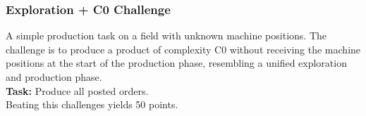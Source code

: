 \documentclass[12pt,twoside]{article}
\newcommand{\reftab}[1]{Table~\ref{#1}}
\begin{document}
\subsubsection{Exploration + C0 Challenge}\label{sec:challenge-combine-exp-c0}
A simple production task on a field with unknown machine positions.
The challenge is to produce a product of complexity C0 without receiving the
machine positions at the start of the production phase, resembling a unified
exploration and production phase.\\
\textbf{Task:} Produce all posted orders.\\
Beating this challenges yields 50 points.

\end{document}
